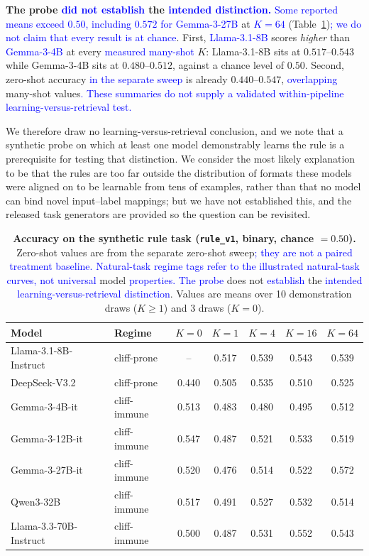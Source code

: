 \documentclass[11pt]{article}
\begin{document}
\textbf{The probe \textcolor{blue}{did not establish} the \textcolor{blue}{intended distinction.}} \textcolor{blue}{Some reported means exceed
$0.50$, including $0.572$ for Gemma-3-27B} at \textcolor{blue}{$K{=}64$} (Table~\ref{stab:synth})\textcolor{blue}{; we do not
claim that every result is at chance}. First, \textcolor{blue}{Llama-3.1-8B} scores
\emph{higher} than \textcolor{blue}{Gemma-3-4B} at every \textcolor{blue}{measured many-shot} $K$: Llama-3.1-8B sits at
$0.517$--$0.543$ while Gemma-3-4B sits at $0.480$--$0.512$, against a chance level of
$0.50$. Second, zero-shot accuracy \textcolor{blue}{in the separate sweep} is already
$0.440$--$0.547$, \textcolor{blue}{overlapping} many-shot values\textcolor{blue}{. These summaries do not supply a
validated within-pipeline learning-versus-retrieval test.}

We therefore draw no learning-versus-retrieval conclusion, and we note that a synthetic
probe on which at least one model demonstrably learns the rule is a prerequisite for
testing that distinction. We consider the most likely explanation to be that the rules are
too far outside the distribution of formats these models were aligned on to be learnable
from tens of examples, rather than that no model can bind novel input--label mappings; but
we have not established this, and the released task generators are provided so the
question can be revisited.

\begin{table}[h]
\centering
\caption{\textbf{Accuracy on the synthetic rule task
(\texttt{rule\_v1}, binary, chance $=0.50$).} Zero-shot values are from the separate
zero-shot sweep\textcolor{blue}{; they are not a paired treatment baseline. Natural-task regime tags refer
to the illustrated natural-task curves, not universal} model \textcolor{blue}{properties. The probe} does
not \textcolor{blue}{establish} the \textcolor{blue}{intended learning-versus-retrieval distinction}.
Values are means over 10 demonstration draws ($K{\geq}1$) and 3 draws ($K{=}0$).}
\label{stab:synth}
\footnotesize
\begin{tabular}{llccccc}
\toprule
Model & Regime & $K{=}0$ & $K{=}1$ & $K{=}4$ & $K{=}16$ & $K{=}64$ \\
\midrule
Llama-3.1-8B-Instruct & cliff-prone   & --      & 0.517 & 0.539 & 0.543 & 0.539 \\
DeepSeek-V3.2         & cliff-prone   & 0.440   & 0.505 & 0.535 & 0.510 & 0.525 \\
Gemma-3-4B-it         & cliff-immune  & 0.513   & 0.483 & 0.480 & 0.495 & 0.512 \\
Gemma-3-12B-it        & cliff-immune  & 0.547   & 0.487 & 0.521 & 0.533 & 0.519 \\
Gemma-3-27B-it        & cliff-immune  & 0.520   & 0.476 & 0.514 & 0.522 & 0.572 \\
Qwen3-32B             & cliff-immune  & 0.517   & 0.491 & 0.527 & 0.532 & 0.514 \\
Llama-3.3-70B-Instruct& cliff-immune  & 0.500   & 0.487 & 0.531 & 0.552 & 0.543 \\
\bottomrule
\end{tabular}
\end{table}
\end{document}
